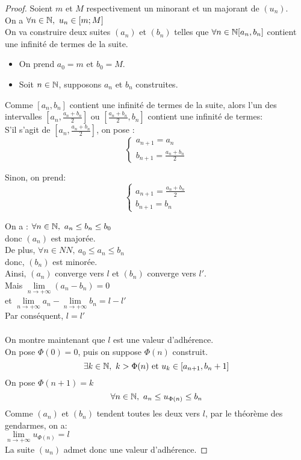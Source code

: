 \documentclass[../main.tex]{subfile}
\begin{document}
\begin{proof}
	Soient $m$ et $M$ respectivement un minorant et un majorant de $(u_n)$.\\
	On a $\forall n \in \mathbb{N}, \ u_n \in [m; M]$\\
	On va construire deux suites $(a_n)$ et $(b_n)$ telles que $\forall n \in \mathbb{N} [a_n, b_n]$ contient une infinité de termes de la suite.
	\begin{itemize}
		\item On prend $a_0 = m$ et $b_0 = M$.
		\item Soit $n \in \mathbb{N}$, supposons $a_n$ et $b_n$ construites.
	\end{itemize}
	Comme $[a_n, b_n]$ contient une infinité de termes de la suite, alors l'un des intervalles $[a_n, \frac{a_n + b_n}{2}]$ ou $[\frac{a_n + b_n}{2}, b_n]$ contient une infinité de termes:\\

	S'il s'agit de $[a_n, \frac{a_n + b_n}{2}]$, on pose : 
	$$\left \{
	\begin{array}{l}
		a_{n+1} = a_n\\
		b_{n+1} = \frac{a_n + b_n}{2}
	\end{array}
	\right .
	$$

	Sinon, on prend:
	$$\left \{
	\begin{array}{l}
		a_{n+1} = \frac{a_n + b_n}{2}\\
		b_{n+1} = b_n
	\end{array}
	\right .
	$$

	On a : $\forall n \in \mathbb{N}, \ a_n \leq b_n \leq b_0$\\
	donc $(a_n)$ est majorée.\\
	De plus, $\forall n \in NN, \ a_0 \leq a_n \leq b_n$\\
	donc, $(b_n)$ est minorée.\\
	Ainsi, $(a_n)$ converge vers $l$ et $(b_n)$ converge vers $l'$.\\
	Mais $\lim\limits_{n \to + \infty} (a_n - b_n) = 0$\\
	et $\lim\limits_{n \to + \infty} a_n - \lim\limits_{n \to + \infty} b_n = l - l'$\\
	Par conséquent, $l = l'$
	$$\phantom{a}$$

	On montre maintenant que $l$ est une valeur d'adhérence.\\
	On pose $\Phi (0) = 0$, puis on suppose $\Phi (n)$ construit.\\
	$$\exists k \in \mathbb{N}, \ k > \Phi (n) \text{ et } u_k \in [a_{n+1}, b_n+1]$$
	On pose $\Phi (n+1) = k$
	$$\forall n \in \mathbb{N}, \ a_n \leq u_{\Phi(n)} \leq b_n$$
	Comme $(a_n)$ et $(b_n)$ tendent toutes les deux vers $l$, par le théorème des gendarmes, on a:\\
	$\lim\limits_{n \to +\infty} u_{\Phi(n)} = l$\\
	La suite $(u_n)$ admet donc une valeur d'adhérence.
\end{proof}
\end{document}

